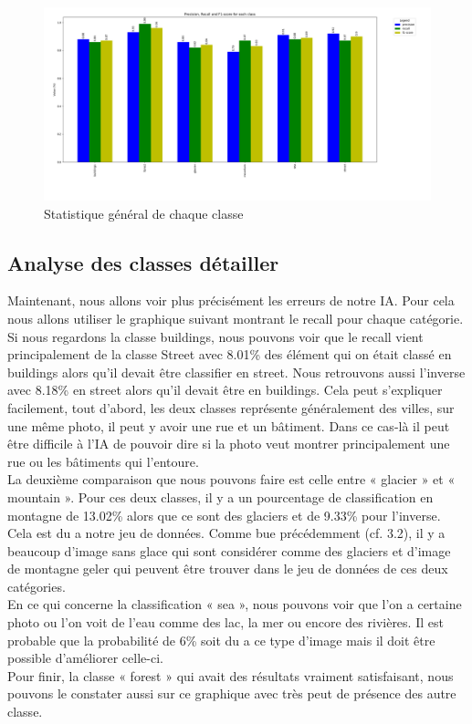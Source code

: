 \documentclass[12pt ,a4paper ]{article}
\begin{document}
\begin{figure}[h]
    \begin{center}
        \includegraphics[width=1.15\textwidth]{./img/class_plot.png}
    \end{center}
    \caption{Statistique général de chaque classe}
\end{figure}
\begin{multicols}{2} 

\subsection{Analyse des classes détailler}

Maintenant, nous allons voir plus précisément les erreurs de notre IA. Pour cela nous allons utiliser le graphique suivant montrant le recall pour chaque catégorie.\\
Si nous regardons la classe buildings, nous pouvons voir que le recall vient principalement de la classe Street avec 8.01\% des élément qui on était classé en buildings alors qu’il devait être classifier en street. Nous retrouvons aussi l’inverse avec 8.18\% en street alors qu’il devait être en buildings. Cela peut s’expliquer facilement, tout d’abord, les deux classes représente généralement des villes, sur une même photo, il peut y avoir une rue et un bâtiment. Dans ce cas-là il peut être difficile à l’IA de pouvoir dire si la photo veut montrer principalement une rue ou les bâtiments qui l’entoure.\\
La deuxième comparaison que nous pouvons faire est celle entre « glacier » et « mountain ». Pour ces deux classes, il y a un pourcentage de classification en montagne de 13.02\% alors que ce sont des glaciers et de 9.33\% pour l’inverse. Cela est du a notre jeu de données. Comme bue précédemment (cf. 3.2), il y a beaucoup d’image sans glace qui sont considérer comme des glaciers et d’image de montagne geler qui peuvent être trouver dans le jeu de données de ces deux catégories.\\
En ce qui concerne la classification « sea », nous pouvons voir que l’on a certaine photo ou l’on voit de l’eau comme des lac, la mer ou encore des rivières. Il est probable que la probabilité de 6\% soit du a ce type d’image mais il doit être possible d’améliorer celle-ci.\\
Pour finir, la classe « forest » qui avait des résultats vraiment satisfaisant, nous pouvons le constater aussi sur ce graphique avec très peut de présence des autre classe.\\

\end{multicols}
\end{document}
